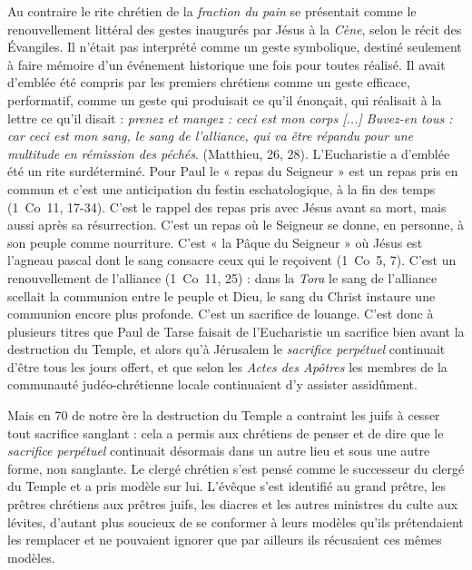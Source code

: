  Au contraire le rite chrétien de la \emph{fraction du pain} se présentait comme le renouvellement littéral des gestes inaugurés par Jésus à la \emph{Cène}, selon le récit des Évangiles. Il n'était pas interprété comme un geste symbolique, destiné seulement à faire mémoire d'un événement historique une fois pour toutes réalisé. Il avait d'emblée été compris par les premiers chrétiens comme un geste efficace, performatif, comme un geste qui produisait ce qu'il énonçait, qui réalisait à la lettre ce qu'il disait : \emph{prenez et mangez : ceci est mon corps \emph{[...]} Buvez-en tous : car ceci est mon sang, le sang de l'alliance, qui va être répandu pour une multitude en rémission des péchés}. (Matthieu, 26, 28). L'Eucharistie a d'emblée été un rite surdéterminé. Pour Paul le « repas du Seigneur » est un repas pris en commun et c'est une anticipation du festin eschatologique, à la fin des temps (1~Co~11, 17-34). C'est le rappel des repas pris avec Jésus avant sa mort, mais aussi après sa résurrection. C'est un repas où le Seigneur se donne, en personne, à son peuple comme nourriture. C'est « la Pâque du Seigneur » où Jésus est l'agneau pascal dont le sang consacre ceux qui le reçoivent (1~Co~5, 7). C'est un renouvellement de l'alliance (1~Co~11, 25) : dans la \emph{Tora} le sang de l'alliance scellait la communion entre le peuple et Dieu, le sang du Christ instaure une communion encore plus profonde. C'est un sacrifice de louange. C'est donc à plusieurs titres que Paul de Tarse faisait de l'Eucharistie un sacrifice bien avant la destruction du Temple, et alors qu'à Jérusalem le \emph{sacrifice perpétuel} continuait d'être tous les jours offert, et que selon les \emph{Actes des Apôtres} les membres de la communauté judéo-chrétienne locale continuaient d'y assister assidûment.

 Mais en 70 de notre ère la destruction du Temple a contraint les juifs à cesser tout sacrifice sanglant : cela a permis aux chrétiens de penser et de dire que le \emph{sacrifice perpétuel} continuait désormais dans un autre lieu et sous une autre forme, non sanglante. Le clergé chrétien s'est pensé comme le successeur du clergé du Temple et a pris modèle sur lui. L'évêque s'est identifié au grand prêtre, les prêtres chrétiens aux prêtres juifs, les diacres et les autres ministres du culte aux lévites, d'autant plus soucieux de se conformer à leurs modèles qu'ils prétendaient les remplacer et ne pouvaient ignorer que par ailleurs ils récusaient ces mêmes modèles.

